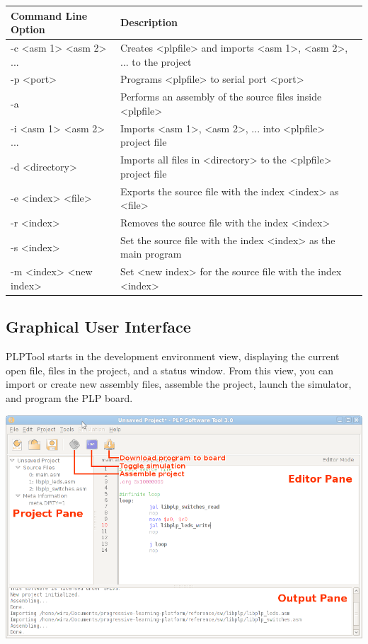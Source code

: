 \documentclass{article}
\begin{document}
\begin{tabular}{ | l | l | }
\hline
Command Line Option & Description \\ \hline
-c <asm 1> <asm 2> ... & Creates <plpfile> and imports <asm 1>, <asm 2>, ... to the project \\
-p <port> 	& Programs <plpfile> to serial port <port> \\
-a 	& Performs an assembly of the source files inside <plpfile> \\
-i <asm 1> <asm 2> ... 	& Imports <asm 1>, <asm 2>, ... into <plpfile> project file \\

-d <directory> 	& Imports all files in <directory> to the <plpfile> project file \\
-e <index> <file> 	& Exports the source file with the index <index> as <file> \\
-r <index> 	& Removes the source file with the index <index> \\
-s <index> 	& Set the source file with the index <index> as the main program\\

-m <index> <new index> 	& Set <new index> for the source file with the index <index> \\
\hline
\end{tabular}

\subsection{Graphical User Interface}
PLPTool starts in the development environment view, displaying the current open file, files in the project, and a status window. From this view, you can import or create new assembly files, assemble the project, launch the simulator, and program the PLP board. 

\begin{center}
\includegraphics[scale=0.5]{../../images/plptool/plptool30_editor_view.png}
\end{center}
\end{document}
